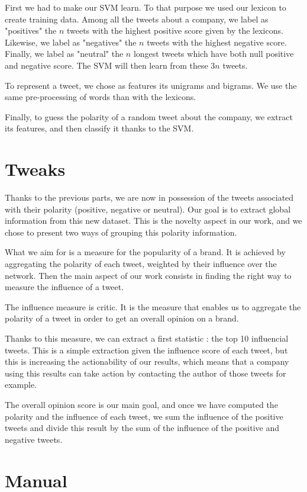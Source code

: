 \documentclass[a4paper,12pt]{report}
\begin{document}
First we had to make our SVM learn. To that purpose we used our lexicon to create training data. Among all the tweets about a company, we label as "positives" the $n$ tweets with the highest positive score given by the lexicons. Likewise, we label as "negatives" the $n$ tweets with the highest negative score. Finally, we label as "neutral" the $n$ longest tweets which have both null positive and negative score. The SVM will then learn from these $3n$ tweets.

To represent a tweet, we chose as features its unigrams and bigrams. We use the same pre-processing of words than with the lexicons.

Finally, to guess the polarity of a random tweet about the company, we extract its features, and then classify it thanks to the SVM.

\section{Tweaks}

Thanks to the previous parts, we are now in possession of the tweets associated with their polarity (positive, negative or neutral). Our goal is to extract global information from this new dataset.
This is the novelty aspect in our work, and we chose to present two ways of grouping this polarity information.

What we aim for is a measure for the popularity of a brand. It is achieved by aggregating the polarity of each tweet, weighted by their influence over the network.
Then the main aspect of our work consists in finding the right way to measure the influence of a tweet.

The influence measure is critic. It is the measure that enables us to aggregate the polarity of a tweet in order to get an overall opinion on a brand.

Thanks to this measure, we can extract a first statistic : the top 10 influencial tweets. This is a simple extraction given the influence score of each tweet, but this is increasing the actionability of our results, which means that a company using this results can take action by contacting the author of those tweets for example.

The overall opinion score is our main goal, and once we have computed the polarity and the influence of each tweet, we sum the influence of the positive tweets and divide this result by the sum of the influence of the positive and negative tweets.

\section{Manual}
\end{document}
